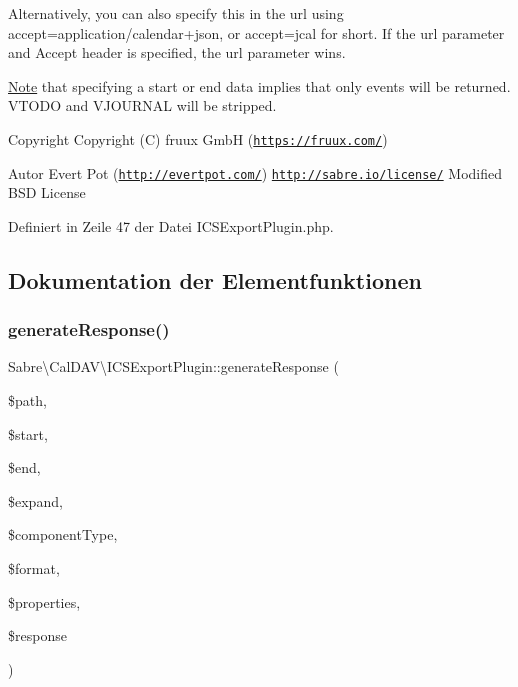 Alternatively, you can also specify this in the url using accept=application/calendar+json, or accept=jcal for short. If the url parameter and Accept header is specified, the url parameter wins.

\mbox{\hyperlink{class_note}{Note}} that specifying a start or end data implies that only events will be returned. V\+T\+O\+DO and V\+J\+O\+U\+R\+N\+AL will be stripped.

\begin{DoxyCopyright}{Copyright}
Copyright (C) fruux GmbH (\href{https://fruux.com/}{\tt https\+://fruux.\+com/}) 
\end{DoxyCopyright}
\begin{DoxyAuthor}{Autor}
Evert Pot (\href{http://evertpot.com/}{\tt http\+://evertpot.\+com/})  \href{http://sabre.io/license/}{\tt http\+://sabre.\+io/license/} Modified B\+SD License 
\end{DoxyAuthor}


Definiert in Zeile 47 der Datei I\+C\+S\+Export\+Plugin.\+php.



\subsection{Dokumentation der Elementfunktionen}
\mbox{\label{class_sabre_1_1_cal_d_a_v_1_1_i_c_s_export_plugin_abd3c2a8067834cb0e301e4fd0efb3521}} 
\subsubsection{\texorpdfstring{generate\+Response()}{generateResponse()}}
{\footnotesize\ttfamily Sabre\textbackslash{}\+Cal\+D\+A\+V\textbackslash{}\+I\+C\+S\+Export\+Plugin\+::generate\+Response (\begin{DoxyParamCaption}\item[{}]{\$path,  }\item[{}]{\$start,  }\item[{}]{\$end,  }\item[{}]{\$expand,  }\item[{}]{\$component\+Type,  }\item[{}]{\$format,  }\item[{}]{\$properties,  }\item[{\mbox{\hyperlink{interface_sabre_1_1_h_t_t_p_1_1_response_interface}{Response\+Interface}}}]{\$response }\end{DoxyParamCaption})\hspace{0.3cm}{\ttfamily [protected]}}

